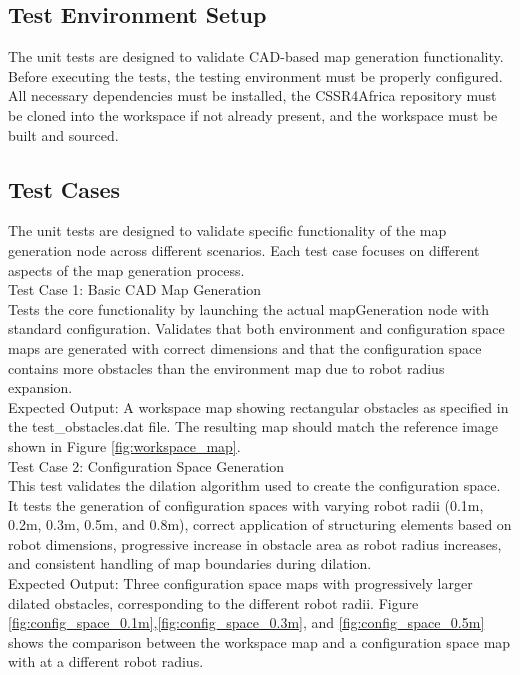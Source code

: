 \documentclass{CSSRforAfrica}
\begin{document}
\subsection{Test Environment Setup}

The unit tests are designed to validate CAD-based map generation functionality. Before executing the tests, the testing environment must be properly configured. All necessary dependencies must be installed, the CSSR4Africa repository must be cloned into the workspace if not already present, and the workspace must be built and sourced.

\subsection{Test Cases}

The unit tests are designed to validate specific functionality of the map generation node across different scenarios. Each test case focuses on different aspects of the map generation process. \\

\noindent Test Case 1: Basic CAD Map Generation \\
Tests the core functionality by launching the actual mapGeneration node with standard configuration. Validates that both environment and configuration space maps are generated with correct dimensions and that the configuration space contains more obstacles than the environment map due to robot radius expansion.\\

\noindent Expected Output: A workspace map showing rectangular obstacles as specified in the test\_obstacles.dat file. The resulting map should match the reference image shown in Figure \ref{fig:workspace_map}.\\

\noindent Test Case 2: Configuration Space Generation \\
This test validates the dilation algorithm used to create the configuration space. It tests the generation of configuration spaces with varying robot radii (0.1m, 0.2m, 0.3m, 0.5m, and 0.8m), correct application of structuring elements based on robot dimensions, progressive increase in obstacle area as robot radius increases, and consistent handling of map boundaries during dilation.\\

\noindent Expected Output: Three configuration space maps with progressively larger dilated obstacles, corresponding to the different robot radii. Figure \ref{fig:config_space_0.1m},\ref{fig:config_space_0.3m}, and \ref{fig:config_space_0.5m} shows the comparison between the workspace map and a configuration space map with at a different robot radius.\\
\end{document}
